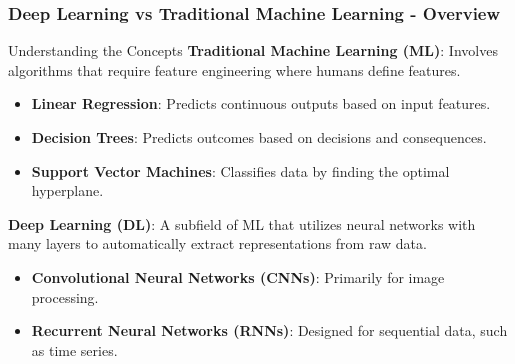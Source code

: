 \documentclass[aspectratio=169]{beamer}
\begin{document}
\begin{frame}[fragile]
    \frametitle{Deep Learning vs Traditional Machine Learning - Overview}
    \begin{block}{Understanding the Concepts}
        \textbf{Traditional Machine Learning (ML)}: Involves algorithms that require feature engineering where humans define features.
        \begin{itemize}
            \item \textbf{Linear Regression}: Predicts continuous outputs based on input features.
            \item \textbf{Decision Trees}: Predicts outcomes based on decisions and consequences.
            \item \textbf{Support Vector Machines}: Classifies data by finding the optimal hyperplane.
        \end{itemize}

        \textbf{Deep Learning (DL)}: A subfield of ML that utilizes neural networks with many layers to automatically extract representations from raw data.
        \begin{itemize}
            \item \textbf{Convolutional Neural Networks (CNNs)}: Primarily for image processing.
            \item \textbf{Recurrent Neural Networks (RNNs)}: Designed for sequential data, such as time series.
        \end{itemize}
    \end{block}
\end{frame}
\end{document}
